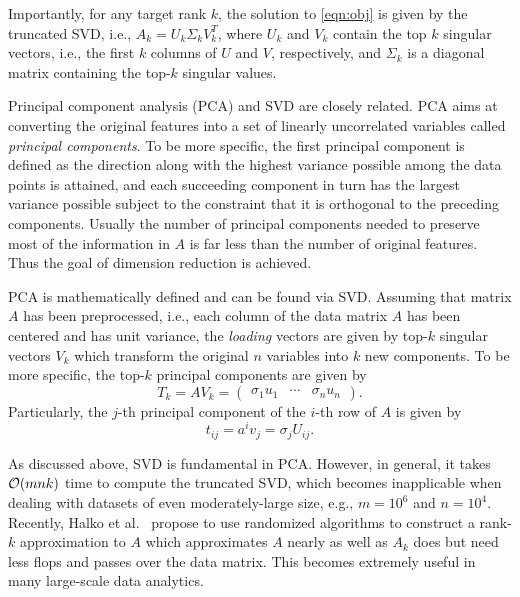  
Importantly, for any target rank $k$, the solution to \eqref{eqn:obj} is given by the truncated SVD, i.e., $A_k = U_k \Sigma_k V_k^T$, where $U_k$ and $V_k$ contain the top $k$ singular vectors, i.e., the first $k$ columns of $U$ and $V$, respectively, and $\Sigma_k$ is a diagonal matrix containing the top-$k$ singular values.

Principal component analysis (PCA) and SVD are closely related.
PCA aims at converting the original features into a set of linearly uncorrelated variables called {\it principal components}.
To be more specific, the first principal component is defined as the direction along with the highest variance possible among the data points is attained, and each succeeding component in turn has the largest variance possible subject to the constraint that it is orthogonal to the preceding components.
Usually the number of principal components needed to preserve most of the information in $A$ is far less than the number of original features. Thus the goal of dimension reduction is achieved.

PCA is mathematically defined and can be found via SVD.
Assuming that matrix $A$ has been preprocessed, i.e., each column of the data matrix $A$ has been centered and has unit variance, the {\it loading} vectors are given by top-$k$ singular vectors $V_k$ which transform the original $n$ variables into $k$ new components. To be more specific, the top-$k$ principal components are given by 
\begin{equation}
  T_k = A V_k = \begin{pmatrix} \sigma_1 u_1 & \cdots & \sigma_n u_n \end{pmatrix}.
\end{equation}
Particularly, the $j$-th principal component of the $i$-th row of $A$ is given by 
\begin{equation}
  t_{ij} = a^i v_j = \sigma_j U_{ij}.
\end{equation}

As discussed above, SVD is fundamental in PCA. However, in general, it takes $\operatorname{\mathcal{O}}(mnk)$ time to compute the truncated SVD, which becomes inapplicable when dealing with datasets of even moderately-large size, e.g., $m = 10^6$ and $n = 10^4$. Recently, Halko et al.~\cite{HMT09_SIREV} propose to use randomized algorithms to construct a rank-$k$ approximation to $A$ which approximates $A$ nearly as well as $A_k$ does but need less flops and passes over the data matrix. This becomes extremely useful in many large-scale data analytics.


